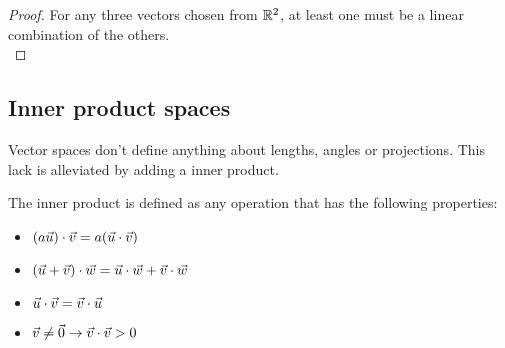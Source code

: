 \begin{proof} \label{proofBaseSizeEqualsSpaceDimension}
For any three vectors chosen from $\mathbb{R}^2$, at least one must be a linear combination of the others. \\
\end{proof}

\begin{theorem}
\end{theorem}

\begin{theorem}
\end{theorem}









\subsection{Inner product spaces}
Vector spaces don't define anything about lengths, angles or projections. This lack is alleviated by adding a inner product. 

\begin{definition} The inner product is defined as any operation that has the following properties:
\begin{itemize}
    \item $(a\vec{u}) \cdot \vec{v} = a (\vec{u} \cdot \vec{v}) $
    \item $(\vec{u} + \vec{v}) \cdot \vec{w} = \vec{u} \cdot \vec{w} + \vec{v} \cdot \vec{w}$
    \item $\vec{u} \cdot \vec{v} = \vec{v} \cdot \vec{u}$
    \item $\vec{v} \neq \vec{0} \to \vec{v} \cdot \vec{v} > 0$
\end{itemize}
\end{definition}

